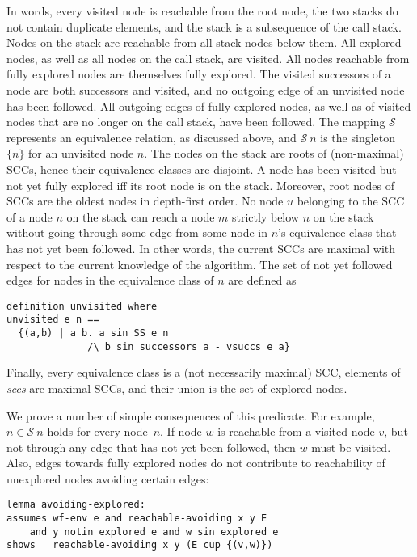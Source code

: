 \documentclass[sigplan,10pt,anonymous,review]{acmart}
\newcommand{\prog}[1]{\textit{#1}}
\renewcommand{\SS}{\mathcal{S}}
\begin{document}
In words, every visited node is reachable from the root node, the two stacks do not contain duplicate elements, and the stack is a subsequence of the call stack. Nodes on the stack are reachable from all stack nodes below them. All explored nodes, as well as all nodes on the call stack, are visited. All nodes reachable from fully explored nodes are themselves fully explored. The visited successors of a node are both successors and visited, and no outgoing edge of an unvisited node has been followed. All outgoing edges of fully explored nodes, as well as of visited nodes that are no longer on the call stack, have been followed. The mapping $\SS$ represents an equivalence relation, as discussed above, and $\SS~n$ is the singleton $\{n\}$ for an unvisited node $n$. The nodes on the stack are roots of (non-maximal) SCCs, hence their equivalence classes are disjoint. A node has been visited but not yet fully explored iff its root node is on the stack. Moreover, root nodes of SCCs are the oldest nodes in depth-first order. No node $u$ belonging to the SCC of a node $n$ on the stack can reach a node $m$ strictly below $n$ on the stack without going through some edge from some node in $n$'s equivalence class that has not yet been followed. In other words, the current SCCs are maximal with respect to the current knowledge of the algorithm. The set of not yet followed edges for nodes in the equivalence class of $n$ are defined as
%
\begin{small}
\begin{lstlisting}[language=isabelle]
definition unvisited where
unvisited e n ==
  {(a,b) | a b. a sin SS e n 
              /\ b sin successors a - vsuccs e a}
\end{lstlisting}
\end{small}
%
Finally, every equivalence class is a (not necessarily maximal) SCC, elements of \prog{sccs} are maximal SCCs, and their union is the set of explored nodes.

We prove a number of simple consequences of this predicate. For example, $n \in \SS~n$ holds for every node~$n$. If node $w$ is reachable from a visited node $v$, but not through any edge that has not yet been followed, then $w$ must be visited. Also, edges towards fully explored nodes do not contribute to reachability of unexplored nodes avoiding certain edges:
%
\begin{small}
\begin{lstlisting}[language=isabelle]
lemma avoiding-explored:
assumes wf-env e and reachable-avoiding x y E
    and y notin explored e and w sin explored e
shows   reachable-avoiding x y (E cup {(v,w)})
\end{lstlisting}
\end{small}
\end{document}
